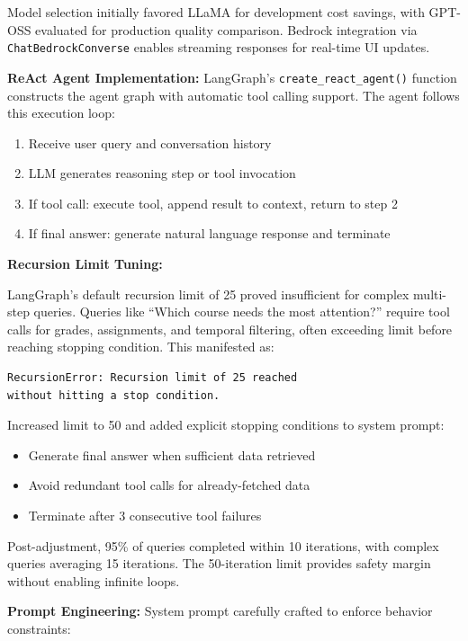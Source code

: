\documentclass{article}
\begin{document}
Model selection initially favored LLaMA for development cost savings, with GPT-OSS evaluated for production quality comparison. Bedrock integration via \texttt{ChatBedrockConverse} enables streaming responses for real-time UI updates.

\textbf{ReAct Agent Implementation:} LangGraph's \texttt{create\_react\_agent()} function constructs the agent graph with automatic tool calling support. The agent follows this execution loop:

\begin{enumerate}
    \item Receive user query and conversation history
    \item LLM generates reasoning step or tool invocation
    \item If tool call: execute tool, append result to context, return to step 2
    \item If final answer: generate natural language response and terminate
\end{enumerate}

\textbf{Recursion Limit Tuning:}

LangGraph's default recursion limit of 25 proved insufficient for complex multi-step queries. Queries like ``Which course needs the most attention?'' require tool calls for grades, assignments, and temporal filtering, often exceeding limit before reaching stopping condition. This manifested as:

\begin{verbatim}
RecursionError: Recursion limit of 25 reached 
without hitting a stop condition.
\end{verbatim}

Increased limit to 50 and added explicit stopping conditions to system prompt:
\begin{itemize}
    \item Generate final answer when sufficient data retrieved
    \item Avoid redundant tool calls for already-fetched data
    \item Terminate after 3 consecutive tool failures
\end{itemize}

Post-adjustment, 95\% of queries completed within 10 iterations, with complex queries averaging 15 iterations. The 50-iteration limit provides safety margin without enabling infinite loops.

\textbf{Prompt Engineering:} System prompt carefully crafted to enforce behavior constraints:
\end{document}
